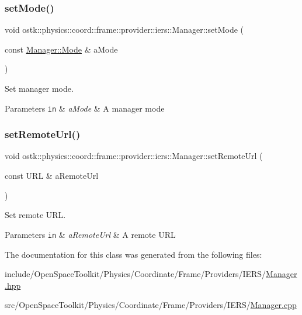 \subsubsection{\texorpdfstring{set\+Mode()}{setMode()}}
{\footnotesize\ttfamily void ostk\+::physics\+::coord\+::frame\+::provider\+::iers\+::\+Manager\+::set\+Mode (\begin{DoxyParamCaption}\item[{const \hyperlink{classostk_1_1physics_1_1coord_1_1frame_1_1provider_1_1iers_1_1_manager_a3a8dd1081d1094069417687b4a3f16ba}{Manager\+::\+Mode} \&}]{a\+Mode }\end{DoxyParamCaption})}



Set manager mode. 


\begin{DoxyParams}[1]{Parameters}
\mbox{\tt in}  & {\em a\+Mode} & A manager mode \\
\hline
\end{DoxyParams}
\mbox{\label{classostk_1_1physics_1_1coord_1_1frame_1_1provider_1_1iers_1_1_manager_a4beb69ab9704ee45f06ec5cdf3df4dde}} 
\subsubsection{\texorpdfstring{set\+Remote\+Url()}{setRemoteUrl()}}
{\footnotesize\ttfamily void ostk\+::physics\+::coord\+::frame\+::provider\+::iers\+::\+Manager\+::set\+Remote\+Url (\begin{DoxyParamCaption}\item[{const U\+RL \&}]{a\+Remote\+Url }\end{DoxyParamCaption})}



Set remote U\+RL. 


\begin{DoxyParams}[1]{Parameters}
\mbox{\tt in}  & {\em a\+Remote\+Url} & A remote U\+RL \\
\hline
\end{DoxyParams}


The documentation for this class was generated from the following files\+:\begin{DoxyCompactItemize}
\item 
include/\+Open\+Space\+Toolkit/\+Physics/\+Coordinate/\+Frame/\+Providers/\+I\+E\+R\+S/\hyperlink{_coordinate_2_frame_2_providers_2_i_e_r_s_2_manager_8hpp}{Manager.\+hpp}\item 
src/\+Open\+Space\+Toolkit/\+Physics/\+Coordinate/\+Frame/\+Providers/\+I\+E\+R\+S/\hyperlink{_coordinate_2_frame_2_providers_2_i_e_r_s_2_manager_8cpp}{Manager.\+cpp}\end{DoxyCompactItemize}
